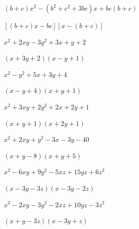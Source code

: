 \documentclass[windows,csize4,answers]{BHCexam}
\begin{document}
\begin{groups}
    \begin{questions}[]
        \begin{multicols}{2}
            \question[5]$(b+c)x^2-(b^2+c^2+3bc)x+bc(b+c)$
            \begin{solution}{0.5cm}
                \methodonly $[(b+c)x-bc][x-(b+c)]$
            \end{solution}

            \question[5]$x^2+2xy-3y^2+3x+y+2$
            \begin{solution}{0.5cm}
                \methodonly $(x+3y+2)(x-y+1)$
            \end{solution}
        \end{multicols}
        \vspace{3.5cm}

        \begin{multicols}{2}
            \question[5]$x^2-y^2+5x+3y+4$
            \begin{solution}{0.5cm}
                \methodonly $(x-y+4)(x+y+1)$
            \end{solution}

            \question[5]$x^2+3xy+2y^2+2x+2y+1$
            \begin{solution}{0.5cm}
                \methodonly $(x+y+1)(x+2y+1)$
            \end{solution}
        \end{multicols}

        \vspace{3.5cm}

        \begin{multicols}{2}
            \question[5]$x^2+2xy+y^2-3x-3y-40$
            \begin{solution}{0.5cm}
                \methodonly $(x+y-8)(x+y+5)$
            \end{solution}

            \question[5]$x^2-6xy+9y^2-5xz+15yz+6z^2$
            \begin{solution}{0.5cm}
                \methodonly $(x-3y-3z)(x-3y-2z)$
            \end{solution}
        \end{multicols}
        \vspace{3.5cm}

        \begin{multicols}{2}
            \question[5]$x^2-2xy-3y^2-2xz+10yz-3z^2$
            \begin{solution}{0.5cm}
                \methodonly $(x+y-3z)(x-3y+z)$
            \end{solution}


\end{multicols}
\end{questions}
\end{groups}
\end{document}
